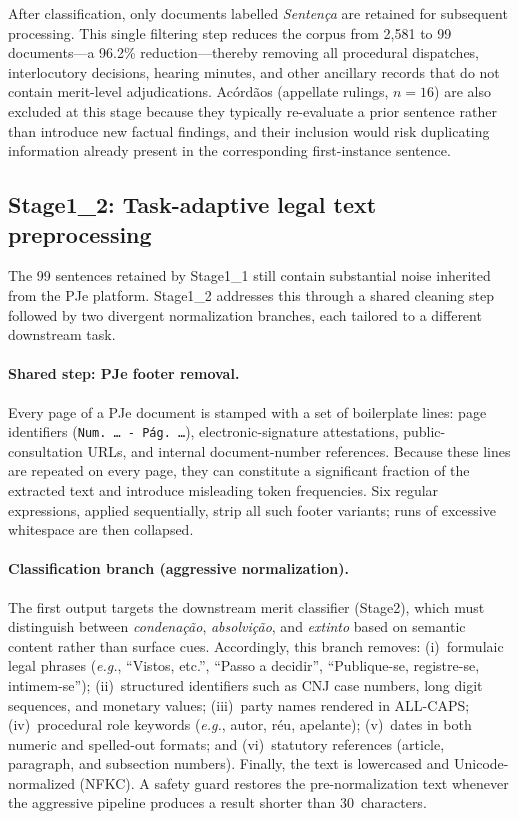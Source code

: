 \documentclass[preprint,a4paper,fleqn]{cas-dc}
\begin{document}
After classification, only documents labelled \textit{Senten\c{c}a} are retained for subsequent processing. This single filtering step reduces the corpus from 2,581 to 99 documents---a 96.2\% reduction---thereby removing all procedural dispatches, interlocutory decisions, hearing minutes, and other ancillary records that do not contain merit-level adjudications. Ac\'ord\~aos (appellate rulings, $n=16$) are also excluded at this stage because they typically re-evaluate a prior sentence rather than introduce new factual findings, and their inclusion would risk duplicating information already present in the corresponding first-instance sentence.

\subsection{Stage1\_2: Task-adaptive legal text preprocessing}
\label{subsec:stage1_2}

The 99 sentences retained by Stage1\_1 still contain substantial noise inherited from the PJe platform. Stage1\_2 addresses this through a shared cleaning step followed by two divergent normalization branches, each tailored to a different downstream task.

\paragraph{Shared step: PJe footer removal.}
Every page of a PJe document is stamped with a set of boilerplate lines: page identifiers (\texttt{Num.~\dots~-~P\'ag.~\dots}), electronic-signature attestations, public-consultation URLs, and internal document-number references. Because these lines are repeated on every page, they can constitute a significant fraction of the extracted text and introduce misleading token frequencies. Six regular expressions, applied sequentially, strip all such footer variants; runs of excessive whitespace are then collapsed.

\paragraph{Classification branch (aggressive normalization).}
The first output targets the downstream merit classifier (Stage2), which must distinguish between \textit{condena\c{c}\~ao}, \textit{absolvi\c{c}\~ao}, and \textit{extinto} based on semantic content rather than surface cues. Accordingly, this branch removes: (i)~formulaic legal phrases (\textit{e.g.}, ``Vistos, etc.'', ``Passo a decidir'', ``Publique-se, registre-se, intimem-se''); (ii)~structured identifiers such as CNJ case numbers, long digit sequences, and monetary values; (iii)~party names rendered in ALL-CAPS; (iv)~procedural role keywords (\textit{e.g.}, autor, r\'eu, apelante); (v)~dates in both numeric and spelled-out formats; and (vi)~statutory references (article, paragraph, and subsection numbers). Finally, the text is lowercased and Unicode-normalized (NFKC). A safety guard restores the pre-normalization text whenever the aggressive pipeline produces a result shorter than 30~characters.
\end{document}
